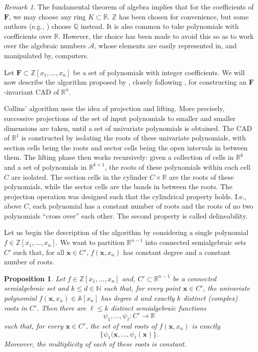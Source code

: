 \documentclass[
]{book}
\newtheorem{proposition}{Proposition}[chapter]
\theoremstyle{definition}
\theoremstyle{definition}
\theoremstyle{definition}
\theoremstyle{definition}
\theoremstyle{remark}
\newtheorem*{remark}{Remark}
\begin{document}
\begin{remark}
The fundamental theorem of algebra implies that for the coefficients of \(\mathbf{F}\), we may choose any ring \(K \subset \mathbb{R}\). \(\mathbb{Z}\) has been chosen for convenience, but some authors (e.g., \citet{pianomovers1983}) choose \(\mathbb{Q}\) instead. It is also common to take polynomials with coefficients over \(\mathbb{R}\). However, the choice has been made to avoid this so as to work over the algebraic numbers \(\mathcal{A}\), whose elements are easily represented in, and manipulated by, computers.
\end{remark}

Let \(\mathbf{F} \subset \mathbb{Z}[x_1,\ldots,x_n]\) be a set of polynomials with integer coefficients. We will now describe the algorithm proposed by \citet{collins1975}, closely following \citet{coste2000}, for constructing an \(\mathbf{F}\)-invariant CAD of \(\mathbb{R}^n\).

Collins' algorithm uses the idea of projection and lifting. More precisely, successive projections of the set of input polynomials to smaller and smaller dimensions are taken, until a set of univariate polynomials is obtained. The CAD of \(\mathbb{R}^1\) is constructed by isolating the roots of these univariate polynomials, with section cells being the roots and sector cells being the open intervals in between them. The lifting phase then works recursively: given a collection of cells in \(\mathbb{R}^k\) and a set of polynomials in \(\mathbb{R}^{k+1}\), the roots of these polynomials within each cell \(C\) are isolated. The section cells in the cylinder \(C \times \mathbb{R}\) are the roots of these polynomials, while the sector cells are the bands in between the roots. The projection operation was designed such that the cylindrical property holds. I.e., above \(C\), each polynomial has a constant number of roots and the roots of no two polynomials ``cross over'' each other.
The second property is called delineability.

Let us begin the description of the algorithm by considering a single polynomial \(f \in \mathbb{Z}[x_1,\ldots,x_n]\).
We want to partition \(\mathbb{R}^{n-1}\) into connected semialgebraic sets \(C'\) such that, for all \(\mathbf{x} \in C'\), \(f(\mathbf{x},x_n)\) has constant degree and a constant number of roots.

\begin{proposition}
\protect\hypertarget{prp:coste-polynomial-to-cell}{}\label{prp:coste-polynomial-to-cell}\citep[Proposition 2.16]{coste2000}
Let \(f \in \mathbb{Z}[x_1,\ldots,x_n]\) and, \(C' \subset \mathbb{R}^{n-1}\) be a connected semialgebraic set and \(k \le d \in \mathbb{N}\) such that, for every point \(\mathbf{x} \in C'\), the univariate polynomial \(f(\mathbf{x},x_n) \in \mathbb{A}[x_n]\) has degree \(d\) and exactly \(k\) distinct (complex) roots in \(C'\).
Then there are \(\ell \le k\) distinct semialgebraic functions
\[\psi_1,\ldots,\psi_\ell : C' \to \mathbb{R}
\]
such that, for every \(\mathbf{x} \in C'\), the set of real roots of \(f(\mathbf{x},x_n)\) is exactly
\[\{ \psi_1(\mathbf{x}, \ldots, \psi_\ell(\mathbf{x}) \}.\]
Moreover, the multiplicity of each of these roots is constant.
\end{proposition}
\end{document}
